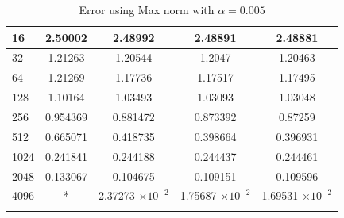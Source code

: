 \begin{table}[H]
\begin{tabular}{lcccc}
		\midrule
		\hspace{7mm} 16 & 2.50002  & 2.48992   & 2.48891   & 2.48881   \\
		\midrule
		\hspace{7mm} 32 & 1.21263  & 1.20544   & 1.2047    & 1.20463   \\
		\midrule
		\hspace{7mm} 64 & 1.21269  & 1.17736   & 1.17517   & 1.17495   \\
		\midrule
		\hspace{7mm} 128 & 1.10164  & 1.03493   & 1.03093   & 1.03048   \\
		\midrule
		\hspace{7mm} 256 & 0.954369 & 0.881472  & 0.873392  & 0.87259   \\
		\midrule
		\hspace{7mm} 512 & 0.665071 & 0.418735  & 0.398664  & 0.396931  \\
		\midrule
		\hspace{7mm} 1024 & 0.241841 & 0.244188  & 0.244437  & 0.244461  \\
		\midrule
		\hspace{7mm} 2048 & 0.133067 & 0.104675  & 0.109151  & 0.109596  \\
		\midrule
		\hspace{7mm} 4096 & * & 2.37273  $\times 10 ^{-2}$ & 1.75687  $\times 10 ^{-2}$ & 1.69531  $\times 10 ^{-2}$\\
		\\
		\bottomrule
	\end{tabular}
	\caption{Error using Max norm with $\alpha =0.005$}
	\label{Galerkin_tabla_max_alpha=005}
	\end{table}
	
	\newpage
